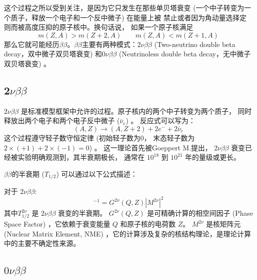 这个过程之所以受到关注，是因为它只发生在那些单贝塔衰变
 (一个中子转变为一个质子，释放一个电子和一个反中微子) 在能量上被
禁止或者因为角动量选择定则而被高度压抑的原子核中。换句话说，
如果一个原子核满足
\begin{equation}
    m (Z, A)  > m (Z+2, A)  \quad \quad m (Z,A)  < m (Z+1, A) 
\end{equation}    
那么它就可能经历$\beta\beta$。$\beta\beta$主要有两种模式：$2\nu\beta\beta$  (Two-neutrino double beta decay，双中微子双贝塔衰变) 
和$0\nu\beta\beta$  (Neutrinoless double beta decay，无中微子双贝塔衰变) 。

\subsection{2$\nu\beta\beta$}

    $2\nu\beta\beta$ 是标准模型框架中允许的过程。原子核内的两个中子转变为两个质子，
    同时释放出两个电子和两个电子反中微子  ($\bar{\nu}_e$) 。
    反应式可以写为：
    \begin{equation}
         (A, Z)  \rightarrow  (A, Z+2)  + 2e^{-} + 2\bar{\nu}_e
    \end{equation}
    这个过程遵守轻子数守恒定律 (初始轻子数为0，
    末态轻子数为 $2 \times  (+1)  + 2 \times  (-1)  = 0$) 。
    这一理论首先被Goeppert M.提出\cite{PhysRev.48.512}，
    $2\nu\beta\beta$ 衰变已经被实验明确观测到，其半衰期极长，
    通常在 $10^{18}$ 到 $10^{21}$ 年的量级或更长\cite{ParticleDataGroup:2024cfk}。

    
$\beta\beta$的半衰期  ($T_{1/2}$)  可以通过以下公式描述：

对于 $2\nu\beta\beta$:
    \begin{equation}
        [ T^{2\nu}_{1/2} ]^{-1} = G^{2\nu} (Q, Z)  | M^{2\nu} |^2
    \end{equation}
    其中$T^{2\nu}_{1/2}$ 是 $2\nu\beta\beta$ 衰变的半衰期。
    $G^{2\nu} (Q, Z) $ 是可精确计算的相空间因子 (Phase Space Factor) ，它依赖于衰变能量 $Q$ 和原子核的电荷数 $Z$。
    $M^{2\nu}$ 是核矩阵元 (Nuclear Matrix Element, NME) ，它的计算涉及复杂的核结构理论，是理论计算中的主要不确定性来源。



\subsection{$0\nu\beta\beta$}

